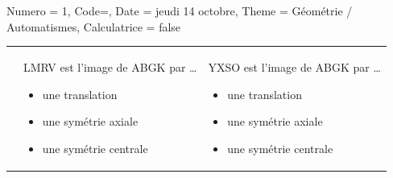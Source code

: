 \documentclass[11pt]{article}
\begin{document}
\begin{Maquette}[IE]{
        Numero = 1, Code={}, Date = jeudi 14 octobre, Theme = Géométrie / Automatismes, Calculatrice = false
    }
\begin{exercice}
{\begin{tabularx}{\textwidth}{X|X|X}
                                    &

            LMRV est l’image de ABGK par …

            \begin{itemize}[label=$\square$, itemsep=10pt, topsep=10pt]
                \item une translation
                \item une symétrie axiale
                \item une symétrie centrale
            \end{itemize}

                                    &
            YXSO est l’image de ABGK par …

            \begin{itemize}[label=$\square$, itemsep=10pt, topsep=10pt]
                \item une translation
                \item une symétrie axiale
                \item une symétrie centrale
            \end{itemize}
        \end{tabularx}
        }
    \end{exercice}


\end{Maquette}
\end{document}
